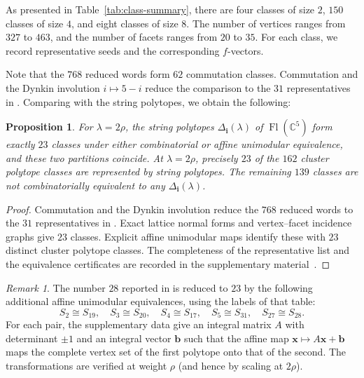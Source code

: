 \documentclass[10pt]{amsart}
\numberwithin{equation}{section}
\DeclareMathOperator{\flag}{Fl}
\theoremstyle{plain}
\newtheorem{proposition}[theorem]{Proposition}
\theoremstyle{definition}
\theoremstyle{remark}
\newtheorem{remark}[theorem]{Remark}
\begin{document}
As presented in Table~\ref{tab:class-summary}, there are four classes of size $2$, $150$ classes of size $4$,
and eight classes of size $8$.
The number of vertices ranges from $327$ to $463$, and the number of facets ranges from $20$ to $35$.
For each class, we record representative seeds and the corresponding $f$-vectors.


Note that the $768$ reduced words form $62$ commutation classes. Commutation 
and the Dynkin involution $i\mapsto5-i$ reduce the comparison to
the $31$ representatives in \cite[Table~6]{BLMM17}. 
Comparing with the string polytopes, we obtain the following:
\begin{proposition}\label{prop_string_classes}
	For $\lambda=2\rho$, the string polytopes
	$\Delta_{\bm i}(\lambda)$ of $\flag(\mathbb C^5)$ form exactly
	$23$ classes under either combinatorial or affine unimodular
	equivalence, and these two partitions coincide.
	At $\lambda=2\rho$, precisely $23$ of the $162$ cluster polytope
	classes are represented by string polytopes. The remaining $139$
	classes are not combinatorially equivalent to any
	$\Delta_{\bm i}(\lambda)$.
\end{proposition}
\begin{proof}
	Commutation and the Dynkin involution reduce the $768$ reduced
	words to the $31$ representatives in \cite[Table~6]{BLMM17}.
	Exact lattice normal forms and vertex--facet incidence graphs
	give $23$ classes. Explicit affine unimodular maps identify these
	with $23$ distinct cluster polytope classes. The completeness of
	the representative list and the equivalence certificates are
	recorded in the supplementary material~\cite{github}.
\end{proof}

\begin{remark}
	The number $28$ reported in \cite[Proposition~4.8 and Table~6]{BLMM17}
	is reduced to $23$ by the following additional affine unimodular
	equivalences, using the labels of that table:
	\[
	S_2\cong S_{19},\quad S_3\cong S_{20},\quad
	S_4\cong S_{17},\quad S_5\cong S_{31},\quad
	S_{27}\cong S_{28}.
	\]
	For each pair, the supplementary data give an integral
	matrix $A$ with determinant $\pm1$ and an integral vector
	$\mathbf b$ such that the affine map
	$\mathbf x\mapsto A\mathbf x+\mathbf b$
	maps the complete vertex set of the first polytope
	onto that of the second.
	The transformations are verified at weight $\rho$ (and hence by scaling at $2\rho$).  
\end{remark}
\end{document}
